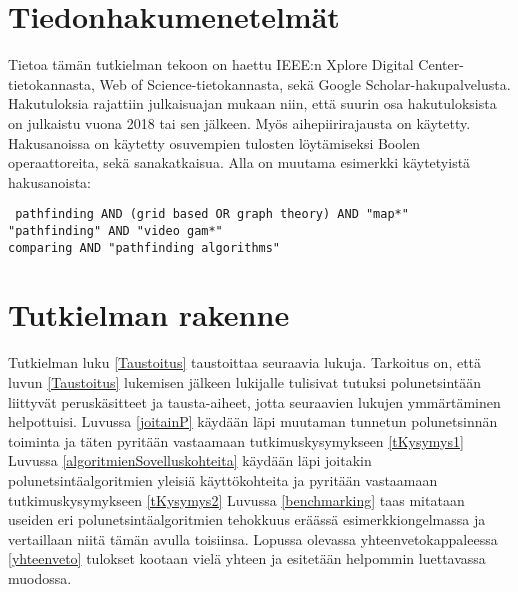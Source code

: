 \section{Tiedonhakumenetelmät}\label{tiedonhakuM}
Tietoa tämän tutkielman tekoon on haettu IEEE:n Xplore Digital 
Center-tietokannasta, Web of Science-tietokannasta, sekä Google 
Scholar-hakupalvelusta. Hakutuloksia rajattiin julkaisuajan mukaan niin, 
että suurin osa hakutuloksista on julkaistu vuona 2018 tai sen jälkeen. 
Myös aihepiirirajausta on käytetty. Hakusanoissa on käytetty osuvempien 
tulosten löytämiseksi Boolen operaattoreita, sekä sanakatkaisua. Alla on 
muutama esimerkki käytetyistä hakusanoista:
\begin{center}
\texttt{
	pathfinding AND (grid based OR graph theory) AND "map*"	\\
	"pathfinding" AND "video gam*"				\\
	comparing AND "pathfinding algorithms"			\\
}
\end{center}

\section{Tutkielman rakenne}\label{tRakenne}
Tutkielman luku \ref{Taustoitus} taustoittaa seuraavia lukuja. Tarkoitus on, 
että luvun \ref{Taustoitus} lukemisen jälkeen lukijalle tulisivat tutuksi 
polunetsintään liittyvät peruskäsitteet ja tausta-aiheet, jotta seuraavien 
lukujen ymmärtäminen helpottuisi. Luvussa \ref{joitainP} käydään läpi 
muutaman tunnetun polunetsinnän toiminta ja täten pyritään vastaamaan 
tutkimuskysymykseen \ref{tKysymys1} Luvussa 
\ref{algoritmienSovelluskohteita} käydään läpi joitakin 
polunetsintäalgoritmien yleisiä käyttökohteita ja pyritään vastaamaan 
tutkimuskysymykseen \ref{tKysymys2} Luvussa \ref{benchmarking} taas mitataan 
useiden eri polunetsintäalgoritmien tehokkuus eräässä esimerkkiongelmassa ja 
vertaillaan niitä tämän avulla toisiinsa. Lopussa olevassa 
yhteenvetokappaleessa \ref{yhteenveto} tulokset kootaan vielä yhteen ja 
esitetään helpommin luettavassa muodossa.

